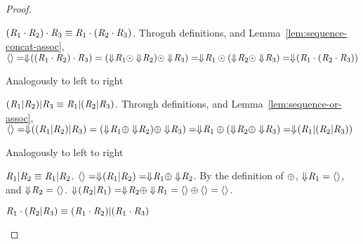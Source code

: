 \documentclass[numbers,10pt,preprint\ifanon ,nocopyrightspace\fi]{sigplanconf}
\begin{document}
\begin{proof}
  \begin{case}
    $(\mathit{R}_1 \cdot \mathit{R}_2) \cdot \mathit{R}_3 \equiv
    \mathit{R}_1 \cdot (\mathit{R}_2 \cdot \mathit{R}_3)$.
    Throguh definitions, and Lemma~\ref{lem:sequence-concat-assoc},
    $\langle\rangle = \Downarrow\mkern-4mu ((\mathit{R}_1 \cdot \mathit{R}_2) \cdot \mathit{R}_3) =
    (\Downarrow\mkern-4mu \mathit{R}_1 \odot \Downarrow\mkern-4mu \mathit{R}_2) \odot
    \Downarrow\mkern-4mu \mathit{R}_3) =
    \Downarrow\mkern-4mu \mathit{R}_1 \odot (\Downarrow\mkern-4mu \mathit{R}_2 \odot
    \Downarrow\mkern-4mu \mathit{R}_3) =
    \Downarrow\mkern-4mu (\mathit{R}_1 \cdot (\mathit{R}_2 \cdot \mathit{R}_3))$
  \end{case}

  \begin{case}
    Analogously to left to right
  \end{case}

  \begin{case}
    $(\mathit{R}_1 | \mathit{R}_2) | \mathit{R}_3 \equiv
    \mathit{R}_1 | (\mathit{R}_2 | \mathit{R}_3)$.
    Through definitions, and Lemma~\ref{lem:sequence-or-assoc},
    $\langle\rangle = \Downarrow\mkern-4mu ((\mathit{R}_1 | \mathit{R}_2) | \mathit{R}_3) =
    (\Downarrow\mkern-4mu \mathit{R}_1 \oplus \Downarrow\mkern-4mu \mathit{R}_2) \oplus
    \Downarrow\mkern-4mu \mathit{R}_3) =
    \Downarrow\mkern-4mu \mathit{R}_1 \oplus (\Downarrow\mkern-4mu \mathit{R}_2 \oplus
    \Downarrow\mkern-4mu \mathit{R}_3) =
    \Downarrow\mkern-4mu (\mathit{R}_1 | (\mathit{R}_2 | \mathit{R}_3))$
  \end{case}

  \begin{case}
    Analogously to left to right
  \end{case}

  \begin{case}[\OrCommutativityRule{}]
    $\mathit{R}_1 | \mathit{R}_2 \equiv \mathit{R}_1 | \mathit{R}_2$.
    $\langle\rangle = \Downarrow\mkern-4mu (\mathit{R}_1 | \mathit{R}_2) =
    \Downarrow\mkern-4mu \mathit{R}_1 \oplus \Downarrow\mkern-4mu \mathit{R}_2$.
    By the definition of $\oplus$, $\Downarrow\mkern-4mu \mathit{R}_1 = \langle\rangle$, and
    $\Downarrow\mkern-4mu \mathit{R}_2 = \langle\rangle$.
    $\Downarrow\mkern-4mu (\mathit{R}_2 | \mathit{R}_1) =
    \Downarrow\mkern-4mu \mathit{R}_2 \oplus \Downarrow\mkern-4mu \mathit{R}_1 =
    \langle\rangle \oplus \langle\rangle = \langle\rangle$.
  \end{case}

  \begin{case}
    $\mathit{R}_1\cdot(\mathit{R}_2|\mathit{R}_3) \equiv
    (\mathit{R}_1\cdot\mathit{R}_2)|(\mathit{R}_1\cdot\mathit{R}_3)$


\end{case}
\end{proof}
\end{document}
